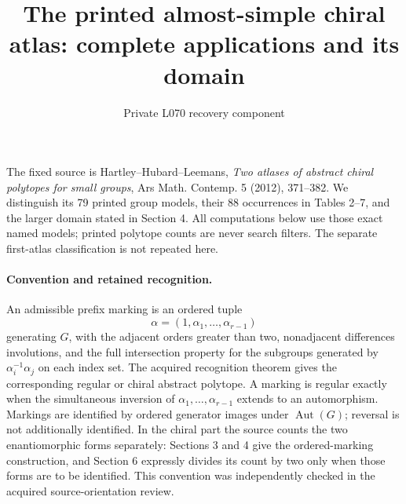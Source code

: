 \documentclass[10pt]{article}
\title{The printed almost-simple chiral atlas: complete applications and its domain}
\author{Private L070 recovery component}\date{}
\newcommand{\Aut}{\operatorname{Aut}}\newcommand{\Out}{\operatorname{Out}}
\begin{document}
\maketitle
The fixed source is Hartley--Hubard--Leemans, \emph{Two atlases of
abstract chiral polytopes for small groups}, Ars Math. Contemp. 5 (2012),
371--382. We distinguish its 79 printed group models, their 88 occurrences
in Tables 2--7, and the larger domain stated in Section 4. All computations
below use those exact named models; printed polytope counts are never
search filters. The separate first-atlas classification is not repeated here.

\paragraph{Convention and retained recognition.}
An admissible prefix marking is an ordered tuple
\[\alpha=(1,\alpha_1,\ldots,\alpha_{r-1})\]
generating $G$, with the
adjacent orders greater than two, nonadjacent differences involutions,
and the full intersection property for the subgroups generated by
$\alpha_i^{-1}\alpha_j$ on each index set. The acquired recognition
theorem gives the corresponding regular or chiral abstract polytope.
A marking is regular exactly when the simultaneous inversion of
$\alpha_1,\ldots,\alpha_{r-1}$ extends to an automorphism.
Markings are identified by ordered generator images under $\Aut(G)$;
reversal is not additionally identified. In the chiral part the source
counts the two enantiomorphic forms separately: Sections 3 and 4 give the
ordered-marking construction, and Section 6 expressly divides its count
by two only when those forms are to be identified. This convention was
independently checked in the acquired source-orientation review.
\end{document}
